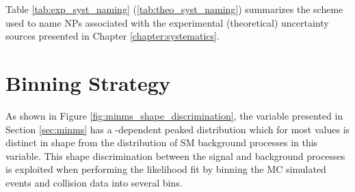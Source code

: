 Table \ref{tab:exp_syst_naming} (\ref{tab:theo_syst_naming}) summarizes the scheme used to name NPs associated with the experimental (theoretical) uncertainty sources presented in Chapter \ref{chapter:systematics}.

\section{Binning Strategy}
\label{sec:binning_strategy}

As shown in Figure \ref{fig:minms_shape_discrimination}, the \minms variable presented in Section \ref{sec:minms} has a \ms-dependent peaked distribution which for most \ms values is distinct in shape from the distribution of SM background processes in this variable. This shape discrimination between the signal and background processes is exploited when performing the likelihood fit by binning the MC simulated events and collision data into several \minms bins. 

